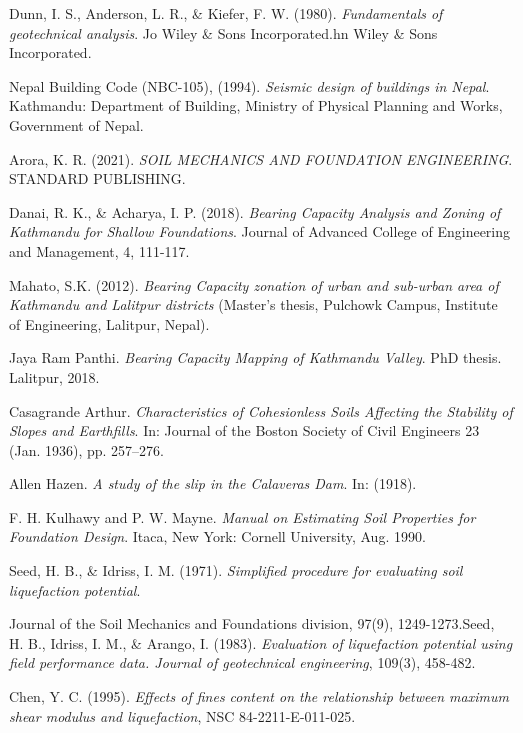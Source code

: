 \begin{thebibliography}{99}

Dunn, I. S., Anderson, L. R., \& Kiefer, F. W. (1980). \emph{Fundamentals of geotechnical analysis}. Jo Wiley \& Sons Incorporated.hn Wiley \& Sons Incorporated.

Nepal Building Code (NBC-105), (1994). \emph{Seismic design of buildings in Nepal}. Kathmandu: Department of Building, Ministry of Physical Planning and Works, Government of Nepal.

Arora, K. R. (2021). \emph{SOIL MECHANICS AND FOUNDATION ENGINEERING}. STANDARD PUBLISHING.

Danai, R. K., \& Acharya, I. P. (2018). \emph{Bearing Capacity Analysis and Zoning of Kathmandu for Shallow Foundations}. Journal of Advanced College of Engineering and Management, 4, 111-117.

Mahato, S.K. (2012). \emph{Bearing Capacity zonation of urban and sub-urban area of Kathmandu and Lalitpur districts} (Master’s thesis, Pulchowk Campus, Institute of Engineering, Lalitpur, Nepal).

Jaya Ram Panthi. \emph{Bearing Capacity Mapping of Kathmandu Valley}. PhD thesis. Lalitpur, 2018.

Casagrande Arthur. \emph{Characteristics of Cohesionless Soils Affecting the Stability of Slopes and Earthfills}. In: Journal of the Boston Society of Civil Engineers 23 (Jan. 1936), pp. 257–276.

Allen Hazen. \emph{A study of the slip in the Calaveras Dam}. In: (1918).

F. H. Kulhawy and P. W. Mayne. \emph{Manual on Estimating Soil Properties for Foundation Design}. Itaca, New York: Cornell University, Aug. 1990.

Seed, H. B., \& Idriss, I. M. (1971). \emph{Simplified procedure for evaluating soil liquefaction potential}.

Journal of the Soil Mechanics and Foundations division, 97(9), 1249-1273.Seed, H. B., Idriss, I. M., \& Arango, I. (1983). \emph{Evaluation of liquefaction potential using field performance data. Journal of geotechnical engineering}, 109(3), 458-482.

Chen, Y. C. (1995). \emph{Effects of fines content on the relationship between maximum shear modulus and liquefaction}, NSC 84-2211-E-011-025.


\end{thebibliography}
